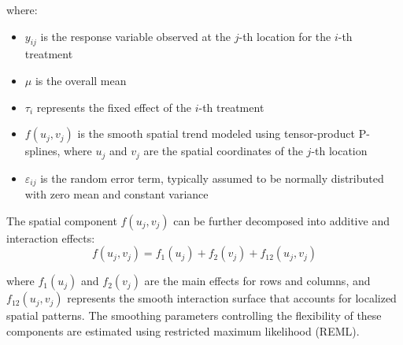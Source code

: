 \documentclass[12pt,a4paper,oneside]{report}
\begin{document}
where: 
\begin{itemize} 
    \item $y_{ij}$ is the response variable observed at the $j$-th location for the $i$-th treatment 
    \item $\mu$ is the overall mean \item $\tau_i$ represents the fixed effect of the $i$-th treatment 
    \item $f(u_j, v_j)$ is the smooth spatial trend modeled using tensor-product P-splines, where $u_j$ and $v_j$ are the spatial coordinates of the $j$-th location 
    \item $\varepsilon_{ij}$ is the random error term, typically assumed to be normally distributed with zero mean and constant variance 
\end{itemize}

The spatial component $f(u_j, v_j)$ can be further decomposed into additive and 
interaction effects: 
\[
f(u_j, v_j) = f_1(u_j) + f_2(v_j) + f_{12}(u_j, v_j)
\]

where $f_1(u_j)$ and $f_2(v_j)$ are the main effects for rows and columns, 
and $f_{12}(u_j, v_j)$ represents the smooth interaction surface that accounts 
for localized spatial patterns. The smoothing parameters controlling the flexibility 
of these components are estimated using restricted maximum likelihood (REML).
\end{document}
